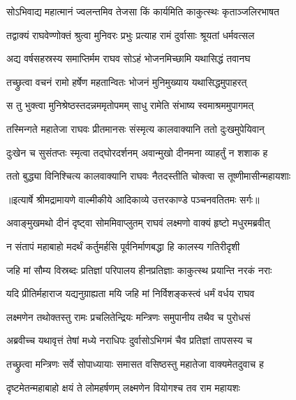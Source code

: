 \twolineshloka
{सोऽभिवाद्य महात्मानं ज्वलन्तमिव तेजसा}
{किं कार्यमिति काकुत्स्थः कृताञ्जलिरभाषत} %

\twolineshloka
{तद्वाक्यं राघवेण्णोक्तं श्रुत्वा मुनिवरः प्रभुः}
{प्रत्याह रामं दुर्वासाः श्रूयतां धर्मवत्सल} %

\twolineshloka
{अद्य वर्षसहस्रस्य समाप्तिर्मम राघव}
{सोऽहं भोजनमिच्छामि यथासिद्धं तवानघ} %

\twolineshloka
{तच्छ्रुत्वा वचनं रामो हर्षेण महतान्वितः}
{भोजनं मुनिमुख्याय यथासिद्धमुपाहरत्} %

\twolineshloka
{स तु भुक्त्वा मुनिश्रेष्ठस्तदन्नममृतोपमम्}
{साधु रामेति संभाष्य स्वमाश्रममुपागमत्} %

\twolineshloka
{तस्मिन्गते महातेजा राघवः प्रीतमानसः}
{संस्मृत्य कालवाक्यानि ततो दुःखमुपेयिवान्} %

\twolineshloka
{दुःखेन च सुसंतप्तः स्मृत्वा तद्घोरदर्शनम्}
{अवान्मुखो दीनमना व्याहर्तुं न शशाक ह} %

\twolineshloka
{ततो बुद्ध्या विनिश्चित्य कालवाक्यानि राघवः}
{नैतदस्तीति चोक्त्वा स तूष्णीमासीन्महायशाः} %


{॥इत्यार्षे श्रीमद्रामायणे वाल्मीकीये आदिकाव्ये उत्तरकाण्डे पञ्चनवतितमः सर्गः॥}


\twolineshloka
{अवाङ्मुखमथो दीनं दृष्ट्वा सोममिवाप्लुतम्}
{राघवं लक्ष्मणो वाक्यं हृष्टो मधुरमब्रवीत्} %

\twolineshloka
{न संतापं महाबाहो मदर्थं कर्तुमर्हसि}
{पूर्वनिर्माणबद्धा हि कालस्य गतिरीदृशी} %

\twolineshloka
{जहि मां सौम्य विस्रब्दः प्रतिज्ञां परिपालय}
{हीनप्रतिज्ञाः काकुत्स्थ प्रयान्ति नरकं नराः} %

\twolineshloka
{यदि प्रीतिर्महाराज यद्यनुग्राह्यता मयि}
{जहि मां निर्विशङ्कस्त्वं धर्मं वर्धय राघव} %

\twolineshloka
{लक्ष्मणेन तथोक्तस्तु रामः प्रचलितेन्द्रियः}
{मन्त्रिणः समुपानीय तथैव च पुरोधसं} %

\twolineshloka
{अब्रवीच्च यथावृत्तं तेषां मध्ये नराधिपः}
{दुर्वासोऽभिगमं चैव प्रतिज्ञां तापसस्य च} %

\twolineshloka
{तच्छ्रुत्वा मन्त्रिणः सर्वे सोपाध्यायाः समासत}
{वसिष्ठस्तु महातेजा वाक्यमेतदुवाच ह} %

\twolineshloka
{दृष्टमेतन्महाबाहो क्षयं ते लोमहर्षणम्}
{लक्ष्मणेन वियोगश्च तव राम महायशः} %

